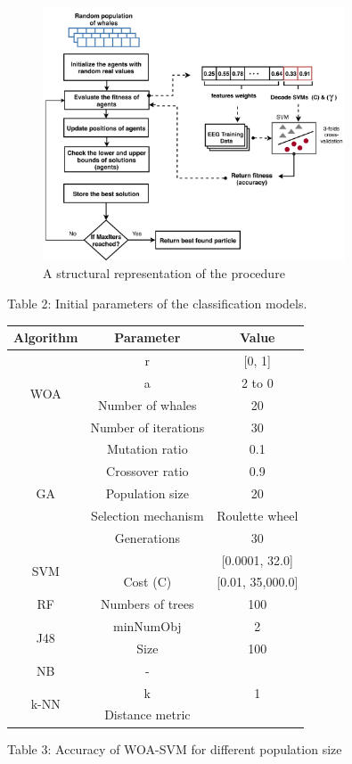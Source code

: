 \documentclass{article}
\begin{document}
\begin{figure}[htbp]
\centering
\includegraphics[width=0.8\textwidth]{images/803c589ba4f13b47d3842e8dcc603380d2dd4363175f03a417f4b721e13f7b75.jpg}
\caption{A structural representation of the procedure}
\end{figure}


Table 2: Initial parameters of the classification models.


\begin{tabular}{|c|c|c|}\hline
Algorithm & Parameter & Value \\ \hline
\multirow{4}{*}{WOA} & r & [0, 1] \\ \cline{2-3}
  & a & 2 to 0 \\ \cline{2-3}
  & Number of whales & 20 \\ \cline{2-3}
  & Number of iterations & 30 \\ \hline
\multirow{5}{*}{GA} & Mutation ratio & 0.1 \\ \cline{2-3}
  & Crossover ratio & 0.9 \\ \cline{2-3}
  & Population size & 20 \\ \cline{2-3}
  & Selection mechanism & Roulette wheel \\ \cline{2-3}
  & Generations & 30 \\ \hline
\multirow{2}{*}{SVM} &  & [0.0001, 32.0] \\ \cline{2-3}
  & Cost (C) & [0.01, 35,000.0] \\ \hline
RF & Numbers of trees & 100 \\ \hline
\multirow{2}{*}{J48} & minNumObj & 2 \\ \cline{2-3}
  & Size & 100 \\ \hline
NB & - &  \\ \hline
\multirow{2}{*}{k-NN} & k & 1 \\ \cline{2-3}
  & Distance metric &  \\ \hline
\end{tabular}
Table 3: Accuracy of WOA-SVM for different population size
\end{document}
